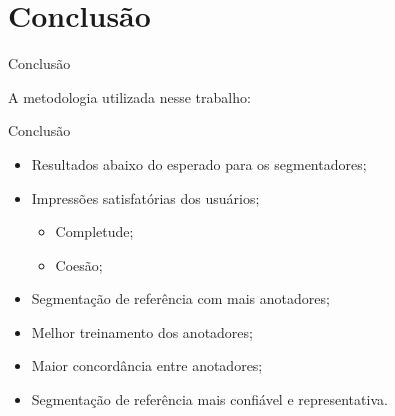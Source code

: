 \documentclass[xcolor=dvipsnames]{beamer}
\begin{document}
\section{Conclusão}
\begin{frame}{Conclusão}
	
A metodologia utilizada nesse trabalho: 
\end{frame}




\begin{frame}{Conclusão}

	\begin{itemize}
		\item Resultados abaixo do esperado para os segmentadores;
		\item Impressões satisfatórias dos usuários;
			\begin{itemize}
				\item Completude;
				\item Coesão;
			\end{itemize}
	\end{itemize}


	\begin{itemize}
		\item Segmentação de referência com mais anotadores;
		\item Melhor treinamento dos anotadores;
		\item Maior concordância entre anotadores;
		\item Segmentação de referência mais confiável e representativa.
	\end{itemize}

\end{frame}
\end{document}
